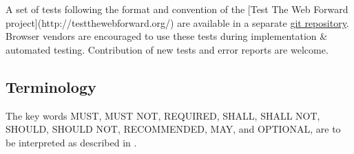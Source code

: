 A set of tests following the format and convention of the [Test The Web Forward project](http://testthewebforward.org/) are available in a separate
\href{https://github.com/MathML/MathMLinHTML5-tests}{git repository}.
Browser vendors are encouraged to use these tests during
implementation \& automated testing. Contribution of new tests and error reports
are welcome.

\subsection{Terminology}

The key words MUST, MUST NOT, REQUIRED, SHALL, SHALL NOT, SHOULD, SHOULD NOT,
RECOMMENDED, MAY, and OPTIONAL, are to be interpreted as described in
\cite{IETF RFC 2119}.
